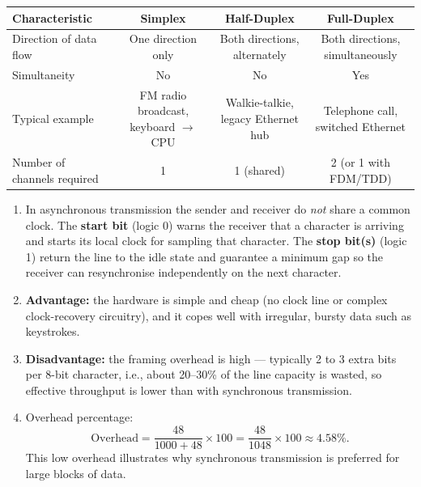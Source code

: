 \documentclass[11pt]{article}
\newcounter{popsec}
\newcounter{popsub}
\newcommand{\courssub}[1]{%
  \stepcounter{popsub}%
  \par\vspace{9pt}\noindent{\popxbold\fontsize{11.5}{13}\selectfont\color{popink}{\color{poporange}\thepopsec.\thepopsub}\hspace{6pt}#1}\par\nopagebreak\vspace{4pt}
}
\begin{document}
\courssub{I practise}

\begin{corrige}
\begin{center}
\begin{tabular}{|l|c|c|c|}
\hline
\textbf{Characteristic} & \textbf{Simplex} & \textbf{Half-Duplex} & \textbf{Full-Duplex} \\ \hline
Direction of data flow & One direction only & Both directions, alternately & Both directions, simultaneously \\ \hline
Simultaneity & No & No & Yes \\ \hline
Typical example & FM radio broadcast, keyboard $\to$ CPU & Walkie-talkie, legacy Ethernet hub & Telephone call, switched Ethernet \\ \hline
Number of channels required & 1 & 1 (shared) & 2 (or 1 with FDM/TDD) \\ \hline
\end{tabular}
\end{center}
\end{corrige}

\begin{corrige}
\begin{enumerate}
\item In asynchronous transmission the sender and receiver do \emph{not} share a common clock. The \textbf{start bit} (logic 0) warns the receiver that a character is arriving and starts its local clock for sampling that character. The \textbf{stop bit(s)} (logic 1) return the line to the idle state and guarantee a minimum gap so the receiver can resynchronise independently on the next character.
\item \textbf{Advantage:} the hardware is simple and cheap (no clock line or complex clock-recovery circuitry), and it copes well with irregular, bursty data such as keystrokes.
\item \textbf{Disadvantage:} the framing overhead is high — typically 2 to 3 extra bits per 8-bit character, i.e., about 20--30\% of the line capacity is wasted, so effective throughput is lower than with synchronous transmission.
\item Overhead percentage:
\[ \text{Overhead} = \frac{48}{1000 + 48} \times 100 = \frac{48}{1048} \times 100 \approx \mathbf{4.58\%}. \]
This low overhead illustrates why synchronous transmission is preferred for large blocks of data.
\end{enumerate}
\end{corrige}
\end{document}
